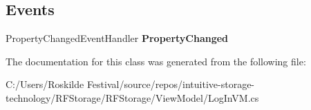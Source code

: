 \subsection*{Events}
\begin{DoxyCompactItemize}
\item 
\mbox{\label{class_r_f_storage_1_1_view_model_1_1_log_in_v_m_aca1fe8ce0da0bbc34aae8dceebf86639}} 
Property\+Changed\+Event\+Handler {\bfseries Property\+Changed}
\end{DoxyCompactItemize}


The documentation for this class was generated from the following file\+:\begin{DoxyCompactItemize}
\item 
C\+:/\+Users/\+Roskilde Festival/source/repos/intuitive-\/storage-\/technology/\+R\+F\+Storage/\+R\+F\+Storage/\+View\+Model/Log\+In\+V\+M.\+cs\end{DoxyCompactItemize}
